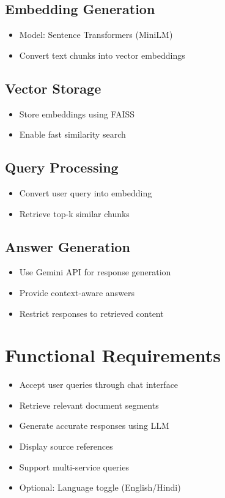 \documentclass[11pt]{article}
\begin{document}
\subsection{Embedding Generation}
\begin{itemize}
    \item Model: Sentence Transformers (MiniLM)
    \item Convert text chunks into vector embeddings
\end{itemize}

\subsection{Vector Storage}
\begin{itemize}
    \item Store embeddings using FAISS
    \item Enable fast similarity search
\end{itemize}

\subsection{Query Processing}
\begin{itemize}
    \item Convert user query into embedding
    \item Retrieve top-k similar chunks
\end{itemize}

\subsection{Answer Generation}
\begin{itemize}
    \item Use Gemini API for response generation
    \item Provide context-aware answers
    \item Restrict responses to retrieved content
\end{itemize}

\section{Functional Requirements}
\begin{itemize}
    \item Accept user queries through chat interface
    \item Retrieve relevant document segments
    \item Generate accurate responses using LLM
    \item Display source references
    \item Support multi-service queries
    \item Optional: Language toggle (English/Hindi)
\end{itemize}
\end{document}
